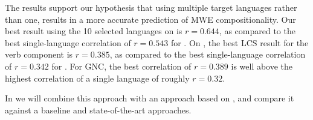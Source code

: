 \documentclass[output=paper,modfonts,nonflat]{langsci/langscibook}
\begin{document}

The results support our hypothesis that using multiple target
languages rather than one, results in a more accurate prediction of
MWE compositionality. Our best result using the 10 selected languages
on \REDDY is $r = 0.644$, as compared to the best single-language
correlation of $r = 0.543$ for . On \BANNARD, the best LCS result
for the verb component is $r = 0.385$, as compared to the best
single-language correlation of $r = 0.342$ for . For GNC, the best
correlation of $r = 0.389$ is well above the highest correlation of a single
language of roughly $r = 0.32$.

In  we will combine this 
approach with an approach based on , and
compare it against a baseline and state-of-the-art approaches.






\end{document}

